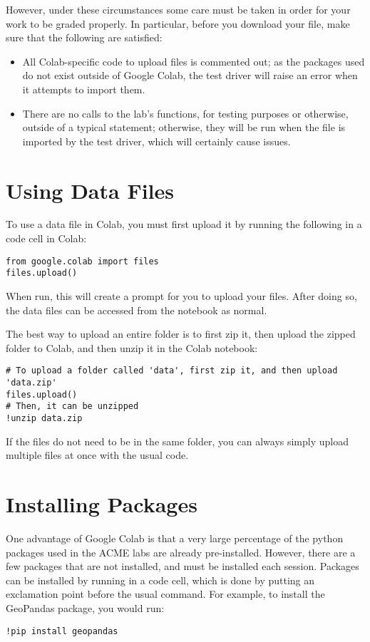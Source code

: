 However, under these circumstances some care must be taken in order for your work to be graded properly.
In particular, before you download your file, make sure that the following are satisfied:
\begin{itemize}
\item All Colab-specific code to upload files is commented out; as the packages used do not exist outside of Google Colab, the test driver will raise an error when it attempts to import them.
\item There are no calls to the lab's functions, for testing purposes or otherwise, outside of a typical  statement; otherwise, they will be run when the file is imported by the test driver, which will certainly cause issues.
\end{itemize}

\section*{Using Data Files}
To use a data file in Colab, you must first upload it by running the following in a code cell in Colab:
\begin{lstlisting}
from google.colab import files
files.upload()
\end{lstlisting}
When run, this will create a prompt for you to upload your files.
After doing so, the data files can be accessed from the notebook as normal.

The best way to upload an entire folder is to first zip it, then upload the zipped folder to Colab, and then unzip it in the Colab notebook:
\begin{lstlisting}
# To upload a folder called 'data', first zip it, and then upload 'data.zip'
files.upload()
# Then, it can be unzipped
!unzip data.zip
\end{lstlisting}
If the files do not need to be in the same folder, you can always simply upload multiple files at once with the usual  code.

\section*{Installing Packages}
One advantage of Google Colab is that a very large percentage of the python packages used in the ACME labs are already pre-installed.
However, there are a few packages that are not installed, and must be installed each session.
Packages can be installed by running  in a code cell, which is done by putting an exclamation point before the usual command.
For example, to install the GeoPandas package, you would run:
\begin{lstlisting}
!pip install geopandas
\end{lstlisting}
